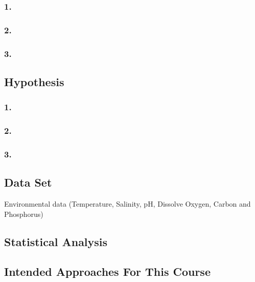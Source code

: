 \documentclass[
]{article}
\begin{document}
\hypertarget{section}{%
\subsubsection{1.}\label{section}}

\hypertarget{section-1}{%
\subsubsection{2.}\label{section-1}}

\hypertarget{section-2}{%
\subsubsection{3.}\label{section-2}}

\hypertarget{hypothesis}{%
\subsection{Hypothesis}\label{hypothesis}}

\hypertarget{section-3}{%
\subsubsection{1.}\label{section-3}}

\hypertarget{section-4}{%
\subsubsection{2.}\label{section-4}}

\hypertarget{section-5}{%
\subsubsection{3.}\label{section-5}}

\hypertarget{data-set}{%
\subsection{Data Set}\label{data-set}}

Environmental data (Temperature, Salinity, pH, Dissolve Oxygen, Carbon
and Phosphorus)

\hypertarget{statistical-analysis}{%
\subsection{Statistical Analysis}\label{statistical-analysis}}

\hypertarget{intended-approaches-for-this-course}{%
\subsection{Intended Approaches For This
Course}\label{intended-approaches-for-this-course}}
\end{document}
